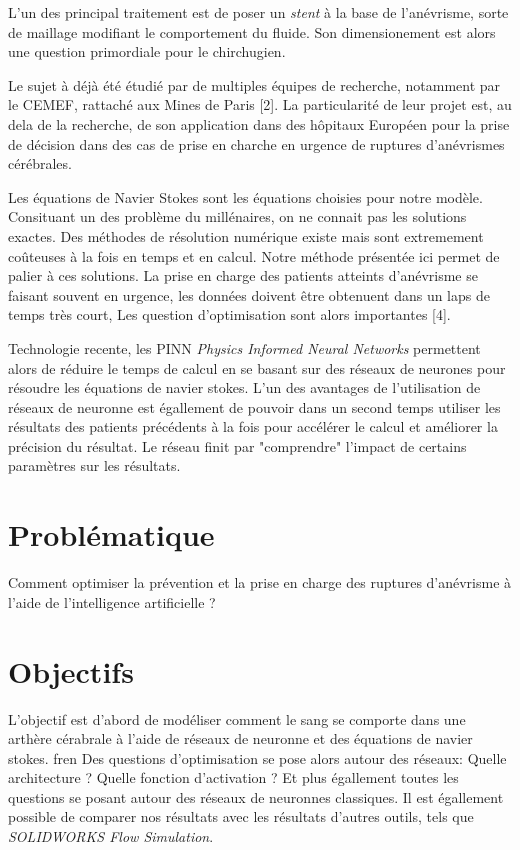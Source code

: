 \documentclass{article}
\begin{document}
L'un des principal traitement est de poser un \emph{stent} à la base de l'anévrisme, sorte de maillage modifiant le comportement du fluide. Son dimensionement est alors une question primordiale pour le chirchugien.

Le sujet à déjà été étudié par de multiples équipes de recherche, notamment par le CEMEF, rattaché aux Mines de Paris [2]. La particularité de leur projet est, au dela de la recherche, de son application dans des hôpitaux Européen pour la prise de décision dans des cas de prise en charche en urgence de ruptures d'anévrismes cérébrales.

Les équations de Navier Stokes sont les équations choisies pour notre modèle. Consituant un des problème du millénaires, on ne connait pas les solutions exactes. Des méthodes  de résolution numérique existe mais sont extremement coûteuses à la fois en temps et en calcul.
Notre méthode présentée ici permet de palier à ces solutions. 
La prise en charge des patients atteints d'anévrisme se faisant souvent en urgence, les données doivent être obtenuent dans un laps de temps très court, Les question d'optimisation sont alors importantes [4]. 

Technologie recente, les PINN \emph{Physics Informed Neural Networks} permettent alors de réduire le temps de calcul en se basant sur des réseaux de neurones pour résoudre les équations de navier stokes. L'un des avantages de l'utilisation de réseaux de neuronne est égallement de pouvoir dans un second temps utiliser les résultats des patients précédents à la fois pour accélérer le calcul et améliorer la précision du résultat. Le réseau finit par "comprendre" l'impact de certains paramètres sur les résultats.

	\section{Problématique}	
	
Comment optimiser la prévention et la prise en charge des ruptures d'anévrisme à l'aide de l'intelligence artificielle ?
	
	\section{Objectifs}

L'objectif est d'abord de modéliser comment le sang se comporte dans une arthère cérabrale à l'aide de réseaux de neuronne et des équations de navier stokes.
fren
Des questions d'optimisation se pose alors autour des réseaux: Quelle architecture ? Quelle fonction d'activation ? Et plus égallement toutes les questions se posant autour des réseaux de neuronnes classiques. Il est égallement possible de comparer nos résultats avec les résultats d'autres outils, tels que \emph{SOLIDWORKS Flow Simulation}.
\end{document}
